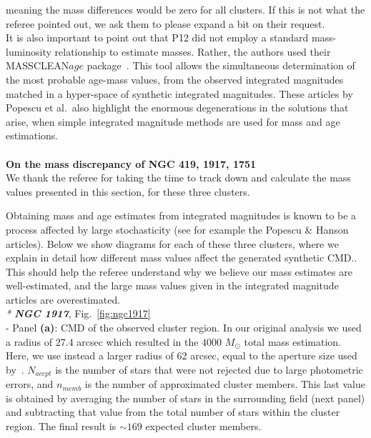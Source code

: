 \documentclass{article}
\begin{document}
\noindent meaning the mass differences would be zero for all clusters. If this
is not what the referee pointed out, we ask them to please expand a bit
on their request.\\

It is also important to point out that P12 did not employ a standard
mass-luminosity relationship to estimate masses. Rather, the authors used
their MASSCLEAN$age$ package~\citep[which in turn depends on their
MASSCLEAN$colors$
package,][]{Popescu_2010b,Popescu_2010a}. This tool allows the simultaneous
determination of the most probable age-mass values, from the observed integrated
magnitudes matched in a hyper-space of synthetic integrated magnitudes.
%
These articles by Popescu et al.~also highlight the enormous degenerations in
the solutions that arise, when simple integrated magnitude methods are used for
mass and age estimations.\\\\

\noindent \textbf{On the mass discrepancy of NGC 419, 1917, 1751}\\

We thank the referee for taking the time to track down and calculate
the mass values presented in this section, for these three clusters.

Obtaining mass and age estimates from integrated magnitudes is known to be a
process affected by large stochasticity (see for example the Popescu \& Hanson
articles). Below we show diagrams for each of these three clusters, where we
explain in detail how different mass values affect the generated synthetic CMD..
This should help the referee understand why we believe our mass estimates are
well-estimated, and the large mass values given in the integrated magnitude
articles are overestimated.\\

\noindent \emph{* \textbf{NGC 1917}}, Fig.~\ref{fig:ngc1917}\\

\noindent - Panel \textbf{(a)}: CMD of the observed cluster region. In our
original analysis we used a radius of 27.4 arcsec which resulted in the 4000
$M_{\odot}$ total mass estimation. Here, we use instead a larger radius of 62
arcsec, equal to the aperture size used by~\cite{vandenBergh_1981}.
%
$N_{accpt}$ is the number of stars that were not rejected due to
large photometric errors, and $n_{memb}$ is the number of approximated cluster
members. This last value is obtained by averaging the number of stars in
the surrounding field (next panel) and subtracting that value from the total
number of stars within the cluster region. The final result is ${\sim}169$
expected cluster members.
\end{document}
